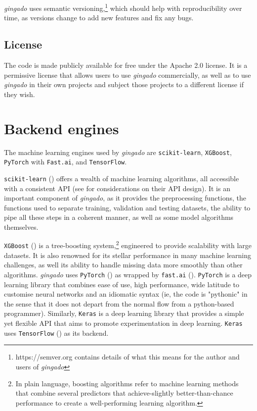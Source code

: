 \documentclass{article}
\begin{document}
\textit{gingado} uses semantic versioning,\footnote{https://semver.org contains details of what this means for the author and users of \textit{gingado}} which should help with reproducibility over time, as versions change to add new features and fix any bugs.

\subsection{License}

The code is made publicly available for free under the Apache 2.0 license. It is a permissive license that allows users to use \textit{gingado} commercially, as well as to use \textit{gingado} in their own projects and subject those projects to a different license if they wish.

\section{Backend engines}\label{backends}

The machine learning engines used by \textit{gingado} are \texttt{scikit-learn}, \texttt{XGBoost}, \texttt{PyTorch} with \texttt{Fast.ai}, and \texttt{TensorFlow}.


\texttt{scikit-learn} (\cite{scikit-learn}) offers a wealth of machine learning algorithms, all accessible with a consistent API (see \cite{sklearn_api} for considerations on their API design). It is an important component of \textit{gingado}, as it provides the preprocessing functions, the functions used to separate training, validation and testing datasets, the ability to pipe all these steps in a coherent manner, as well as some model algorithms themselves.



\texttt{XGBoost} (\cite{xgboost}) is a tree-boosting system,\footnote{In plain language, boosting algorithms refer to machine learning methods that combine several predictors that achieve-slightly better-than-chance performance to create a well-performing learning algorithm.} engineered to provide scalability with large datasets. It is also renowned for its stellar performance in many machine learning challenges, as well its ability to handle missing data more smoothly than other algorithms. \textit{gingado} uses \texttt{PyTorch} (\cite{PyTorch}) as wrapped by \texttt{fast.ai} (\cite{fastai}). \texttt{PyTorch} is a deep learning library that combines ease of use, high performance, wide latitude to customise neural networks and an idiomatic syntax (ie, the code is "pythonic" in the sense that it does not depart from the normal flow from a python-based programmer). Similarly, \texttt{Keras} is a deep learning library that provides a simple yet flexible API that aims to promote experimentation in deep learning. \texttt{Keras} uses \texttt{TensorFlow} (\cite{tensorflow2015-whitepaper}) as its backend.
\end{document}
